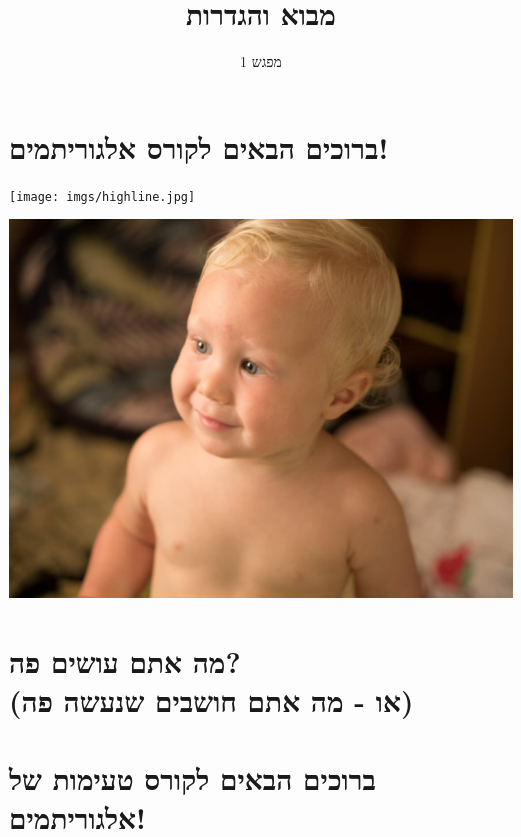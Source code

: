 \documentclass[luatex]{beamer}
\begin{document}
	\title{מבוא והגדרות}
	\subtitle{מפגש 1}
	\date{}
	
 \section{ברוכים הבאים לקורס אלגוריתמים!}

\begin{frame}
\texttt{[image: imgs/highline.jpg]}
\end{frame}
\begin{frame}
\includegraphics[width=\linewidth]{imgs/nael.jpg}
\end{frame}
\section{מה אתם עושים פה? \\ \large{(או - מה אתם חושבים שנעשה פה)}}
\section{ברוכים הבאים לקורס  טעימות של אלגוריתמים!}
\end{document}
